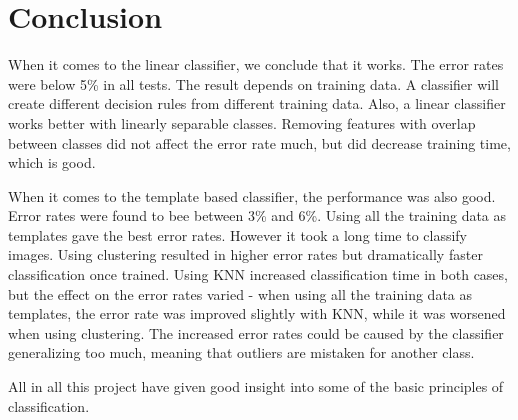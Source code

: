 \section{Conclusion}\label{sec:conclusion}
When it comes to the linear classifier, we conclude that it works. The error rates were below 5\% in all tests. The result depends on training data. A classifier will create different decision rules from different training data. Also, a linear classifier works better with linearly separable classes. Removing features with overlap between classes did not affect the error rate much, but did decrease training time, which is good.

When it comes to the template based classifier, the performance was also good. Error rates were found to bee between 3\% and 6\%. Using all the training data as templates gave the best error rates. However it took a long time to classify images. Using clustering resulted in higher error rates but dramatically faster classification once trained. Using KNN increased classification time in both cases, but the effect on the error rates varied - when using all the training data as templates, the error rate was improved slightly with KNN, while it was worsened when using clustering. The increased error rates could be caused by the classifier generalizing too much, meaning that outliers are mistaken for another class.

All in all this project have given good insight into some of the basic principles of classification.

